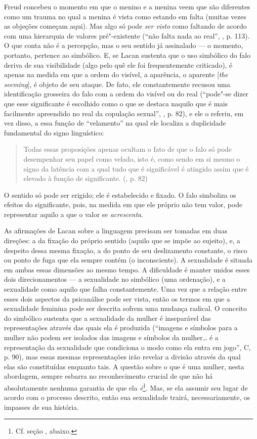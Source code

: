 Freud concebeu o momento em que o menino e a menina veem que são
diferentes como um trauma no qual a menina é vista como estando em falta
(muitas vezes as objeções começam aqui). Mas algo só pode \emph{ser
visto} como faltando de acordo com uma hierarquia de valores
pré"-existente (``não falta nada ao real'', , p. 113). O que conta não
é a percepção, mas o seu sentido já assinalado --- o momento, portanto,
pertence ao simbólico. E, se Lacan sustenta que o uso simbólico do falo
deriva de sua visibilidade (algo pelo quê ele foi frequentemente
criticado), é apenas na medida em que a ordem do visível, a aparência, o
aparente {[}\emph{the seeming}{]}, é objeto de seu ataque. De fato, ele
constantemente recusou uma identificação grosseira do falo com a ordem
do visível ou do real (``pode"-se dizer que esse significante é escolhido
como o que se destaca naquilo que é mais facilmente apreendido no real
da copulação sexual'', , p. 82), e ele o referiu, em vez disso, a essa
função de ``velamento'' na qual ele localiza a duplicidade fundamental
do signo linguístico:

\begin{quote}
Todas essas proposições apenas ocultam o fato de que o falo só pode
desempenhar seu papel como velado, isto é, como sendo em si mesmo o
signo da latência com a qual tudo que é significável é atingido assim
que é elevado à função de significante. (, p. 82)
\end{quote}

O sentido só pode ser erigido; ele é estabelecido e fixado. O falo
simboliza os efeitos do significante, pois, na medida em que ele próprio
não tem valor, pode representar aquilo a que o valor se
\emph{acrescenta}.

As afirmações de Lacan sobre a linguagem precisam ser tomadas em duas
direções: a da fixação do próprio sentido (aquilo que se impõe ao
sujeito), e, a despeito dessa mesma fixação, a do ponto de seu
deslizamento constante, o risco ou ponto de fuga que ela sempre contém
(o inconsciente). A sexualidade é situada em ambas essas dimensões ao
mesmo tempo. A dificuldade é manter unidos esses dois direcionamentos ---
a sexualidade no simbólico (uma ordenação), e a sexualidade como aquilo
que falha constantemente. Uma vez que a relação entre esses dois
aspectos da psicanálise pode ser vista, então os termos em que a
sexualidade feminina pode ser descrita sofrem uma mudança radical. O
conceito do simbólico sustenta que a sexualidade da mulher é inseparável
das representações através das quais ela é produzida (``imagens e
símbolos para a mulher não podem ser isolados das imagens e símbolos da
mulher\ldots{} é a representação da sexualidade que condiciona o modo como
ela entra em jogo'', C, p. 90), mas essas mesmas representações irão
revelar a divisão através da qual elas são constituídas enquanto tais. A
questão sobre o que é uma mulher, nesta abordagem, sempre esbarra no
reconhecimento crucial de que não há absolutamente nenhuma garantia de
que ela \emph{é}\footnote{Cf. seção , abaixo.}. Mas, se ela assumir
seu lugar de acordo com o processo descrito, então sua sexualidade
trairá, necessariamente, os impasses de sua história.

